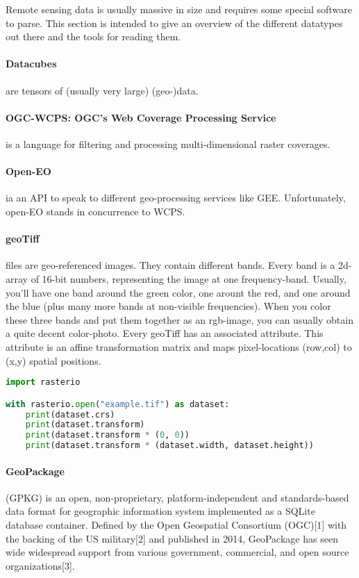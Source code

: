 Remote sensing data is usually massive in size and requires some special software to parse. This section is intended to give an overview of the different datatypes out there and the tools for reading them. 

\paragraph{Datacubes} are tensors of (usually very large) (geo-)data.

\paragraph{OGC-WCPS: OGC's Web Coverage Processing Service} is a language for filtering and processing multi-dimensional raster coverages. 

\paragraph{Open-EO} ia an API to speak to different geo-processing services like GEE. Unfortunately, open-EO stands in concurrence to WCPS. 

\paragraph{geoTiff} files are geo-referenced images. They contain different bands. Every band is a 2d-array of 16-bit numbers, representing the image at one frequency-band. Usually, you'll have one band around the green color, one arount the red, and one around the blue (plus many more bands at non-visible frequencies). When you color these three bands and put them together as an rgb-image, you can usually obtain a quite decent color-photo. 
Every geoTiff has an associated  attribute. This attribute is an affine transformation matrix and maps pixel-locations (row,col) to (x,y) spatial positions.
\begin{lstlisting}[language=python]
import rasterio

with rasterio.open("example.tif") as dataset:
    print(dataset.crs)
    print(dataset.transform)
    print(dataset.transform * (0, 0))
    print(dataset.transform * (dataset.width, dataset.height))
\end{lstlisting}

\paragraph{GeoPackage} (GPKG) is an open, non-proprietary, platform-independent and standards-based data format for geographic information system implemented as a SQLite database container. Defined by the Open Geospatial Consortium (OGC)[1] with the backing of the US military[2] and published in 2014, GeoPackage has seen wide widespread support from various government, commercial, and open source organizations[3].


